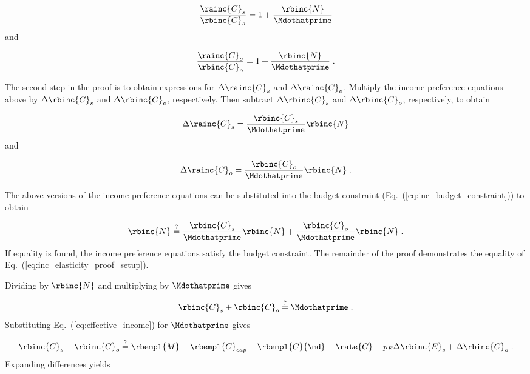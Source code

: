 \begin{equation}
    \frac{\rainc{C}_s}{\rbinc{C}_s} = 1 + \frac{\rbinc{N}}{\Mdothatprime}
\end{equation}
%
and

\begin{equation}
  \frac{\rainc{C}_o}{\rbinc{C}_o} = 1 + \frac{\rbinc{N}}{\Mdothatprime} \; .
\end{equation}
%

The second step in the proof is to obtain expressions 
for $\Delta \rainc{C}_s$ and $\Delta \rainc{C}_o$.
Multiply the income preference equations above
by $\Delta \rbinc{C}_s$ and $\Delta \rbinc{C}_o$, respectively.
Then subtract $\Delta \rbinc{C}_s$ and $\Delta \rbinc{C}_o$, respectively, 
to obtain

\begin{equation}
  \Delta \rainc{C}_s = \frac{\rbinc{C}_s}{\Mdothatprime} \rbinc{N}
\end{equation}
%
and

\begin{equation}
  \Delta \rainc{C}_o = \frac{\rbinc{C}_o}{\Mdothatprime} \rbinc{N} \; .
\end{equation}

The above versions of the income preference equations 
can be substituted into the budget constraint
(Eq.~(\ref{eq:inc_budget_constraint})) to obtain

\begin{equation} \label{eq:inc_elasticity_proof_setup}
  \rbinc{N} \stackrel{?}{=} \frac{\rbinc{C}_s}{\Mdothatprime} \rbinc{N} 
                            + \frac{\rbinc{C}_o}{\Mdothatprime}  \rbinc{N} \; .
\end{equation}
%
If equality is found, 
the income preference equations satisfy the budget constraint.
The remainder of the proof demonstrates the equality
of Eq.~(\ref{eq:inc_elasticity_proof_setup}).

Dividing by $\rbinc{N}$ and multiplying by $\Mdothatprime$ gives

\begin{equation}
  \rbinc{C}_s + \rbinc{C}_o \stackrel{?}{=} \Mdothatprime \; .
\end{equation}
%
Substituting Eq.~(\ref{eq:effective_income}) for $\Mdothatprime$ gives

\begin{equation}
  \rbinc{C}_s + \rbinc{C}_o \stackrel{?}{=} \rbempl{M} - \rbempl{C}_{cap} - \rbempl{C}{\md} 
                       - \rate{G} + p_E \Delta \rbinc{E}_s + \Delta \rbinc{C}_o \; .
\end{equation}
%
Expanding differences yields

